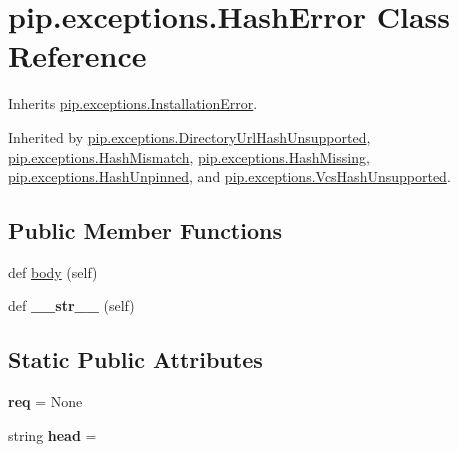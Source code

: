 \hypertarget{classpip_1_1exceptions_1_1_hash_error}{}\section{pip.\+exceptions.\+Hash\+Error Class Reference}
\label{classpip_1_1exceptions_1_1_hash_error}


Inherits \hyperlink{classpip_1_1exceptions_1_1_installation_error}{pip.\+exceptions.\+Installation\+Error}.



Inherited by \hyperlink{classpip_1_1exceptions_1_1_directory_url_hash_unsupported}{pip.\+exceptions.\+Directory\+Url\+Hash\+Unsupported}, \hyperlink{classpip_1_1exceptions_1_1_hash_mismatch}{pip.\+exceptions.\+Hash\+Mismatch}, \hyperlink{classpip_1_1exceptions_1_1_hash_missing}{pip.\+exceptions.\+Hash\+Missing}, \hyperlink{classpip_1_1exceptions_1_1_hash_unpinned}{pip.\+exceptions.\+Hash\+Unpinned}, and \hyperlink{classpip_1_1exceptions_1_1_vcs_hash_unsupported}{pip.\+exceptions.\+Vcs\+Hash\+Unsupported}.

\subsection*{Public Member Functions}
\begin{DoxyCompactItemize}
\item 
def \hyperlink{classpip_1_1exceptions_1_1_hash_error_ad40d9767743dd1fe1dc4b6c0fd4da430}{body} (self)
\item 
\mbox{\label{classpip_1_1exceptions_1_1_hash_error_ab3e17b635226fb645571c6a4ae67c4ec}} 
def {\bfseries \+\_\+\+\_\+str\+\_\+\+\_\+} (self)
\end{DoxyCompactItemize}
\subsection*{Static Public Attributes}
\begin{DoxyCompactItemize}
\item 
\mbox{\label{classpip_1_1exceptions_1_1_hash_error_a427b4d318130b8d1f635881cd0ed7072}} 
{\bfseries req} = None
\item 
\mbox{\label{classpip_1_1exceptions_1_1_hash_error_aafb16061daf0656dc2d9874e66c0370b}} 
string {\bfseries head} = \textquotesingle{}\textquotesingle{}
\end{DoxyCompactItemize}


